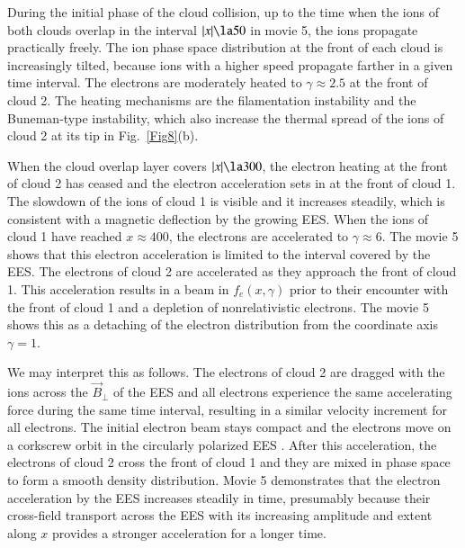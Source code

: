 \documentclass[structabstract]{aa}
\begin{document}
During the initial phase of the cloud collision, up to the time when the 
ions of both clouds overlap in the interval $|x| \la 50$ in movie 5, the 
ions propagate practically freely. The ion phase space distribution at 
the front of each cloud is increasingly tilted, because ions with a higher 
speed propagate farther in a given time interval. The electrons are moderately
heated to $\gamma \approx 2.5$ at the front of cloud 2. The heating mechanisms 
are the filamentation instability and the Buneman-type instability, which also 
increase the thermal spread of the ions of cloud 2 at its tip in 
Fig.~\ref{Fig8}(b). 

When the cloud overlap layer covers $|x| \la 300$, the electron heating 
at the front of cloud 2 has ceased and the electron acceleration sets in
at the front of cloud 1. The slowdown of the ions of cloud 1 is visible
and it increases steadily, which is consistent with a magnetic deflection
by the growing EES. When the ions of cloud 1 have reached $x\approx 400$, 
the electrons are accelerated to $\gamma \approx 6$. The movie 5 shows that 
this electron acceleration is limited to the interval covered by the EES. 
The electrons of cloud 2 are accelerated as they approach the front of
cloud 1. This acceleration results in a beam in $f_e (x,\gamma)$ prior to 
their encounter with the front of cloud 1 and a depletion of nonrelativistic 
electrons. The movie 5 shows this as a detaching of the electron distribution 
from the coordinate axis $\gamma = 1$. 

We may interpret this as follows. The electrons of cloud 2 are dragged with 
the ions across the $\vec{B}_\perp$ of the EES and all electrons experience 
the same accelerating force during the same time interval, resulting in a 
similar velocity increment for all electrons. The initial electron beam 
stays compact and the electrons move on a corkscrew orbit in the circularly 
polarized EES \citep{Shock1}. After this acceleration, the electrons of 
cloud 2 cross the front of cloud 1 and they are mixed in phase space to 
form a smooth density distribution. Movie 5 demonstrates that the electron 
acceleration by the EES increases steadily in time, presumably because their 
cross-field transport across the EES with its increasing amplitude and extent 
along $x$ provides a stronger acceleration for a longer time.
\end{document}
